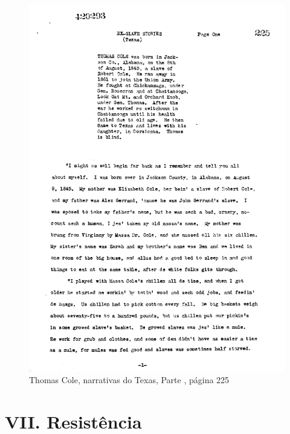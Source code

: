 \begin{absolutelynopagebreak}
\begin{vplace}
\begin{figure}[H]
\begin{adjustwidth}{-1.8cm}{}
  \vspace*{-2cm}
  \includegraphics[width=133mm]{./imgs/Cap7.jpg}  
\end{adjustwidth}
  \caption{Thomas Cole, narrativas do Texas, Parte , página 225}
\end{figure}
\end{vplace}

\end{absolutelynopagebreak}

\chapter{VII. Resistência}

